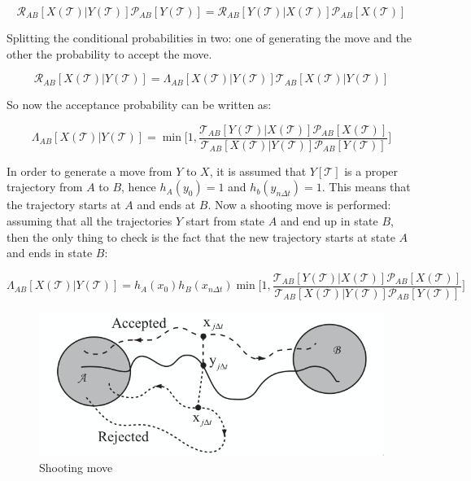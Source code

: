 	$$\mathcal{R}_{AB}[X(\mathcal{T})|Y(\mathcal{T})]\mathcal{P}_{AB}[Y(\mathcal{T})] = \mathcal{R}_{AB}[Y(\mathcal{T})|X(\mathcal{T})]\mathcal{P}_{AB}[X(\mathcal{T})]$$

	Splitting the conditional probabilities in two: one of generating the move and the other the probability to accept the move.

	$$\mathcal{R}_{AB}[X(\mathcal{T})|Y(\mathcal{T})] = \Lambda_{AB}[X(\mathcal{T})|Y(\mathcal{T})]\mathcal{T}_{AB}[X(\mathcal{T})|Y(\mathcal{T})]$$

	So now the acceptance probability can be written as:

	$$\Lambda_{AB}[X(\mathcal{T})|Y(\mathcal{T})] = \min\biggl[1, \frac{\mathcal{T}_{AB}[Y(\mathcal{T})|X(\mathcal{T})]\mathcal{P}_{AB}[X(\mathcal{T})]}{\mathcal{T}_{AB}[X(\mathcal{T})|Y(\mathcal{T})]\mathcal{P}_{AB}[Y(\mathcal{T})]}\biggr]$$

	In order to generate a move from $Y$ to $X$, it is assumed that $Y[\mathcal{T}]$ is a proper trajectory from $A$ to $B$, hence $h_A(y_0) = 1$ and $h_b(y_{n\Delta t}) = 1$.
	This means that the trajectory starts at $A$ and ends at $B$.
	Now a shooting move is performed: assuming that all the trajectories $Y$ start from state $A$ and end up in state $B$, then the only thing to check is the fact that the new trajectory starts at state $A$ and ends in state $B$:

	$$\Lambda_{AB}[X(\mathcal{T})|Y(\mathcal{T})] = h_A(x_0)h_B(x_{n\Delta t})\min\biggl[1, \frac{\mathcal{T}_{AB}[Y(\mathcal{T})|X(\mathcal{T})]\mathcal{P}_{AB}[X(\mathcal{T})]}{\mathcal{T}_{AB}[X(\mathcal{T})|Y(\mathcal{T})]\mathcal{P}_{AB}[Y(\mathcal{T})]}\biggr]$$

	\begin{figure}[H]
		\includegraphics[width=\textwidth]{transition-path-sampling}
		\caption{Shooting move}
		\label{fig:shooting-move}
	\end{figure}

